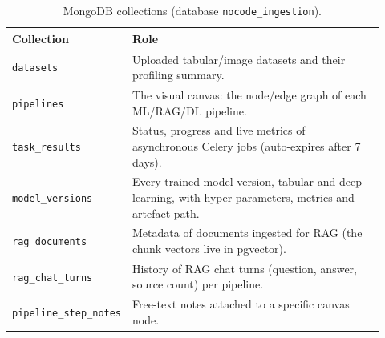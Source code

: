 \documentclass[12pt, a4paper, oneside]{report}
\begin{document}
\begin{table}[H]
\centering
\caption{MongoDB collections (database \texttt{nocode\_ingestion}).}
\label{tab:collections}
\begin{tabular}{|p{0.24\linewidth}|L{0.68\linewidth}|}
\hline
\textbf{Collection} & \textbf{Role} \\
\hline
\texttt{datasets} & Uploaded tabular/image datasets and their profiling summary. \\ \hline
\texttt{pipelines} & The visual canvas: the node/edge graph of each ML/RAG/DL pipeline. \\ \hline
\texttt{task\_results} & Status, progress and live metrics of asynchronous Celery jobs (auto-expires after 7 days). \\ \hline
\texttt{model\_versions} & Every trained model version, tabular and deep learning, with hyper-parameters, metrics and artefact path. \\ \hline
\texttt{rag\_documents} & Metadata of documents ingested for RAG (the chunk vectors live in pgvector). \\ \hline
\texttt{rag\_chat\_turns} & History of RAG chat turns (question, answer, source count) per pipeline. \\ \hline
\texttt{pipeline\_step\_notes} & Free-text notes attached to a specific canvas node. \\
\hline
\end{tabular}
\end{table}
\end{document}
